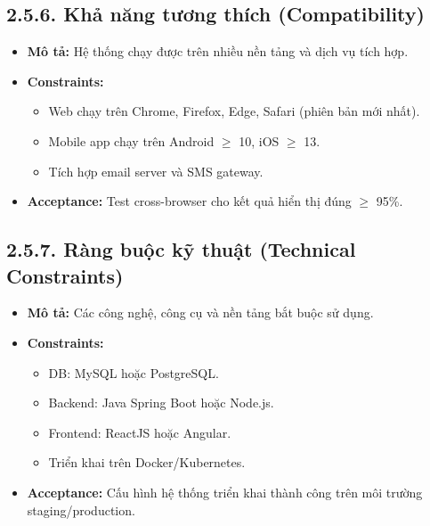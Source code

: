 
\subsection*{2.5.6. Khả năng tương thích (Compatibility)}
\begin{itemize}
    \item \textbf{Mô tả:} Hệ thống chạy được trên nhiều nền tảng và dịch vụ tích hợp.
    \item \textbf{Constraints:}
    \begin{itemize}
        \item Web chạy trên Chrome, Firefox, Edge, Safari (phiên bản mới nhất).
        \item Mobile app chạy trên Android $\geq$ 10, iOS $\geq$ 13.
        \item Tích hợp email server và SMS gateway.
    \end{itemize}
    \item \textbf{Acceptance:} Test cross-browser cho kết quả hiển thị đúng $\geq$ 95\%.
\end{itemize}


\subsection*{2.5.7. Ràng buộc kỹ thuật (Technical Constraints)}
\begin{itemize}
    \item \textbf{Mô tả:} Các công nghệ, công cụ và nền tảng bắt buộc sử dụng.
    \item \textbf{Constraints:}
    \begin{itemize}
        \item DB: MySQL hoặc PostgreSQL.
        \item Backend: Java Spring Boot hoặc Node.js.
        \item Frontend: ReactJS hoặc Angular.
        \item Triển khai trên Docker/Kubernetes.
    \end{itemize}
    \item \textbf{Acceptance:} Cấu hình hệ thống triển khai thành công trên môi trường staging/production.
\end{itemize}

